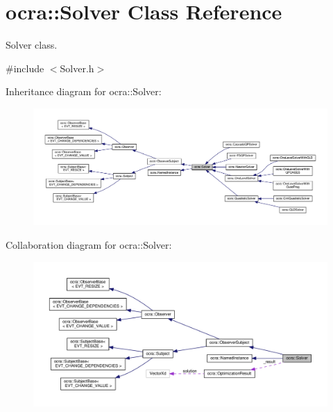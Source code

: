 \hypertarget{classocra_1_1Solver}{}\section{ocra\+:\+:Solver Class Reference}
\label{classocra_1_1Solver}


Solver class.  




{\ttfamily \#include $<$Solver.\+h$>$}



Inheritance diagram for ocra\+:\+:Solver\+:
\nopagebreak
\begin{figure}[H]
\begin{center}
\leavevmode
\includegraphics[width=350pt]{d1/dd1/classocra_1_1Solver__inherit__graph}
\end{center}
\end{figure}


Collaboration diagram for ocra\+:\+:Solver\+:
\nopagebreak
\begin{figure}[H]
\begin{center}
\leavevmode
\includegraphics[width=350pt]{da/dc7/classocra_1_1Solver__coll__graph}
\end{center}
\end{figure}
